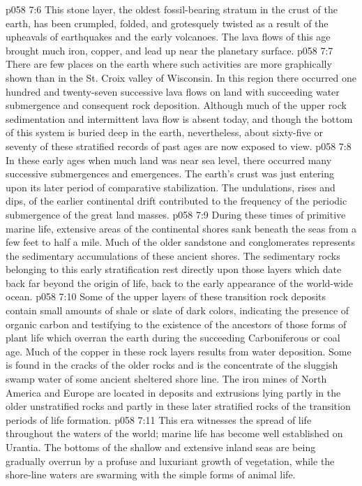 \vs p058 7:6 This stone layer, the oldest fossil\hyp{}bearing stratum in the crust of the earth, has been crumpled, folded, and grotesquely twisted as a result of the upheavals of earthquakes and the early volcanoes. The lava flows of this age brought much iron, copper, and lead up near the planetary surface.
\vs p058 7:7 There are few places on the earth where such activities are more graphically shown than in the St. Croix valley of Wisconsin. In this region there occurred one hundred and twenty\hyp{}seven successive lava flows on land with succeeding water submergence and consequent rock deposition. Although much of the upper rock sedimentation and intermittent lava flow is absent today, and though the bottom of this system is buried deep in the earth, nevertheless, about sixty\hyp{}five or seventy of these stratified records of past ages are now exposed to view.
\pc \vs p058 7:8 In these early ages when much land was near sea level, there occurred many successive submergences and emergences. The earth’s crust was just entering upon its later period of comparative stabilization. The undulations, rises and dips, of the earlier continental drift contributed to the frequency of the periodic submergence of the great land masses.
\vs p058 7:9 During these times of primitive marine life, extensive areas of the continental shores sank beneath the seas from a few feet to half a mile. Much of the older sandstone and conglomerates represents the sedimentary accumulations of these ancient shores. The sedimentary rocks belonging to this early stratification rest directly upon those layers which date back far beyond the origin of life, back to the early appearance of the world\hyp{}wide ocean.
\vs p058 7:10 Some of the upper layers of these transition rock deposits contain small amounts of shale or slate of dark colors, indicating the presence of organic carbon and testifying to the existence of the ancestors of those forms of plant life which overran the earth during the succeeding Carboniferous or coal age. Much of the copper in these rock layers results from water deposition. Some is found in the cracks of the older rocks and is the concentrate of the sluggish swamp water of some ancient sheltered shore line. The iron mines of North America and Europe are located in deposits and extrusions lying partly in the older unstratified rocks and partly in these later stratified rocks of the transition periods of life formation.
\pc \vs p058 7:11 This era witnesses the spread of life throughout the waters of the world; marine life has become well established on Urantia. The bottoms of the shallow and extensive inland seas are being gradually overrun by a profuse and luxuriant growth of vegetation, while the shore\hyp{}line waters are swarming with the simple forms of animal life.
